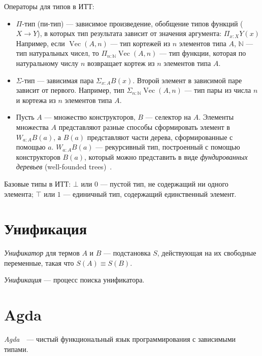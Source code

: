 Операторы для типов в ИТТ:
\begin{itemize}
    \item $\Pi$-тип (пи-тип) — зависимое произведение, обобщение типов функций ($ X \to Y $),
        в которых тип результата зависит от значения аргумента:
        $\Pi_{x : X} Y(x)$
        Например, если $\operatorname{Vec}(A, n)$ — тип кортежей из $n$ элементов типа $A$,
        $\mathbb N$ — тип натуральных чисел, то
        $\Pi_{n \mathbin{:} {\mathbb N}} \operatorname{Vec}(A, n)$ 
        — тип функции, которая по натуральному числу $n$ возвращает кортеж из
        $n$ элементов типа $A$.
    \item $\Sigma$-тип — зависимая пара $\Sigma_{x : A} B(x)$.
        Второй элемент в зависимой паре зависит от первого.
        Например, тип $\Sigma_{n \mathbin{:} {\mathbb N}} \operatorname{Vec}(A, n)$ — тип 
        пары из числа $n$ и кортежа из $n$ элементов типа $A$.
    \item Пусть $A$ — множество конструкторов, $B$ — селектор на $A$.
        Элементы множества $A$ представляют разные способы сформировать
элемент в $W_{a : A} B(a) $, а $B(a)$ представляют части дерева, сформированные с помощью $a$.
        $W_{a : A} B(a) $  — рекурсивный тип, построенный с помощью конструкторов $B(a)$,
        который можно представить в виде \emph{фундированных деревьев} (well-founded trees)~\cite{WTypes}.
\end{itemize}
Базовые типы в ИТТ:
$\bot$ или $0$ — пустой тип, не содержащий ни одного элемента;
$\top$ или $1$ — единичный тип, содержащий единственный элемент.

\section{Унификация}

\emph{Унификатор} для термов $A$ и $B$ — подстановка $S$, действующая на их
свободные переменные, такая что $S(A) \equiv S(B)$.

\emph{Унификация} — процесс поиска унификатора.

\section{Agda}
\emph{Agda}~\cite{AgdaLang}~---  чистый функциональный язык программирования с зависимыми типами.



